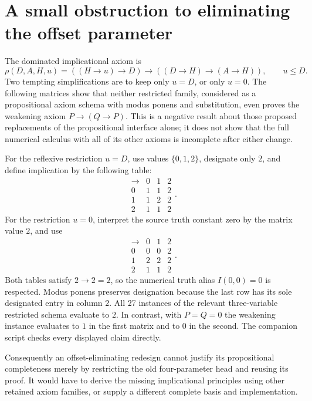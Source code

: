\section{A small obstruction to eliminating the offset parameter}
The dominated implicational axiom is
\[
 \rho(D,A,H,u)=((H\to u)\to D)\to((D\to H)\to(A\to H)),
 \qquad u\le D.
\]
Two tempting simplifications are to keep only \(u=D\), or only \(u=0\).
The following matrices show that neither restricted family, considered
as a propositional axiom schema with modus ponens and substitution,
even proves the weakening axiom \(P\to(Q\to P)\).
This is a negative result about those proposed replacements of the
propositional interface alone; it does not show that the full numerical
calculus with all of its other axioms is incomplete after either change.

For the reflexive restriction \(u=D\), use values \(\{0,1,2\}\),
designate only \(2\), and define implication by the following table:
\[
\begin{array}{c|ccc}
\to&0&1&2\\\hline
0&1&1&2\\
1&1&2&2\\
2&1&1&2
\end{array}.
\]
For the restriction \(u=0\), interpret the source truth constant
zero by the matrix value \(2\), and use
\[
\begin{array}{c|ccc}
\to&0&1&2\\\hline
0&0&0&2\\
1&2&2&2\\
2&1&1&2
\end{array}.
\]
Both tables satisfy \(2\to2=2\), so the numerical truth alias
\(I(0,0)=0\) is respected. Modus ponens preserves designation because
the last row has its sole designated entry in column \(2\).
All 27 instances of the relevant three-variable restricted schema
evaluate to \(2\). In contrast, with \(P=Q=0\) the weakening instance
evaluates to \(1\) in the first matrix and to \(0\) in the second.
The companion script checks every displayed claim directly.

Consequently an offset-eliminating redesign cannot justify its
propositional completeness merely by restricting the old four-parameter
head and reusing its proof. It would have to derive the missing
implicational principles using other retained axiom families, or supply
a different complete basis and implementation.
